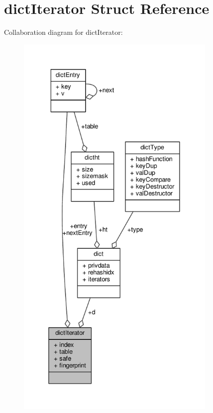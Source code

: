 \hypertarget{structdictIterator}{}\section{dict\+Iterator Struct Reference}
\label{structdictIterator}


Collaboration diagram for dict\+Iterator\+:\nopagebreak
\begin{figure}[H]
\begin{center}
\leavevmode
\includegraphics[height=550pt]{structdictIterator__coll__graph}
\end{center}
\end{figure}
